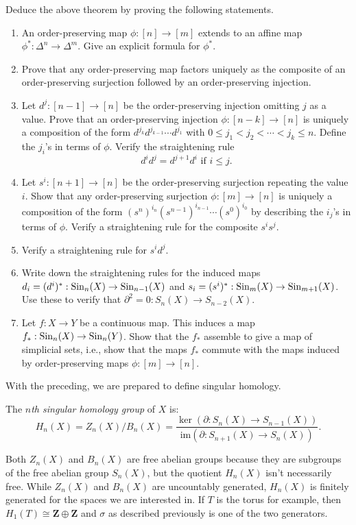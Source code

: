 \begin{exercise}\label{simplicialidentities}
    Deduce the above theorem by proving the following statements.
    \begin{enumerate}
	\item An order-preserving map $\phi:[n]\to[m]$ extends to an affine map
	    $\phi^\ast:\Delta^n\to \Delta^m$. Give an explicit formula for
	    $\phi^\ast$.
	\item Prove that any order-preserving map factors uniquely as the
	    composite of an order-preserving surjection followed by an
	    order-preserving injection.
	\item Let $d^j:[n-1]\to [n]$ be the order-preserving injection omitting
	    $j$ as a value. Prove that an order-preserving injection
	    $\phi:[n-k]\to[n]$ is uniquely a composition of the form $d^{j_k}
	    d^{j_{k-1}}\cdots d^{j_1}$ with $0\leq j_1<j_2<\cdots<j_k\leq n$.
	    Define the $j_i$'s in terms of $\phi$. Verify the straightening
	    rule
	    $$d^id^j = d^{j+1} d^i \text{ if }i\leq j.$$
	\item Let $s^i:[n+1]\to [n]$ be the order-preserving surjection
	    repeating the value $i$. Show that any order-preserving surjection
	    $\phi:[m]\to [n]$ is uniquely a composition of the form
	    $(s^n)^{i_n}(s^{n-1})^{i_{n-1}}\cdots(s^0)^{i_0}$ by describing the
	    $i_j$'s in terms of $\phi$. Verify a straightening rule for the
	    composite $s^i s^j$.
	\item Verify a straightening rule for $s^i d^j$.
	\item Write down the straightening rules for the induced maps $d_i =
	    (d^i)^\ast:\mathrm{Sin}_n(X)\to \mathrm{Sin}_{n-1}(X)$ and $s_i =
	    (s^i)^\ast:\mathrm{Sin}_m(X)\to \mathrm{Sin}_{m+1}(X)$. Use these to verify that
	    $\partial^2 = 0:S_n(X)\to S_{n-2}(X)$.
	\item Let $f:X\to Y$ be a continuous map. This induces a map
	    $f_\ast:\mathrm{Sin}_n(X)\to \mathrm{Sin}_n(Y)$. Show that the $f_\ast$ assemble to
	    give a map of simplicial sets, i.e., show that the maps $f_\ast$
	    commute with the maps induced by order-preserving maps $\phi:[m]\to
	    [n]$.
    \end{enumerate}
\end{exercise}

With the preceding, we are prepared to define singular homology.
\begin{definition}
The \emph{$n$th singular homology group} of $X$ is:
    $$ H_n(X) = Z_n(X)/B_n(X) = \frac{\ker(\partial:S_n(X)\to S_{n-1}(X))}{\mathrm{im}(\partial:S_{n+1}(X)\to S_n(X))}.$$
\end{definition}
Both $Z_n(X)$ and $B_n(X)$ are free abelian groups because they are subgroups of the free abelian group $S_n(X)$, but the quotient $H_n(X)$ isn't necessarily free. While $Z_n(X)$ and $B_n(X)$ are uncountably generated, $H_n(X)$ is finitely generated for the spaces we are interested in. If $T$ is the torus for example, then $H_1(T) \cong \mathbf{Z} \oplus \mathbf{Z}$ and $\sigma$ as described previously is one of the two generators.
